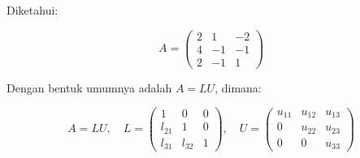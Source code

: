 \documentclass{article}
\begin{document}
\pagestyle{empty}

Diketahui:

\[
A = 
\begin{pmatrix}
2 & 1 & -2 \\
4 & -1 & -1 \\
2 & -1 & 1
\end{pmatrix}
\]

Dengan bentuk umumnya adalah \(A = LU\), dimana:

\[
A = LU, \quad
L =
\begin{pmatrix}
1 & 0 & 0 \\
l_{21} & 1 & 0 \\
l_{31} & l_{32} & 1
\end{pmatrix},
\quad
U =
\begin{pmatrix}
u_{11} & u_{12} & u_{13} \\
0 & u_{22} & u_{23} \\
0 & 0 & u_{33}
\end{pmatrix}
\]
\end{document}

